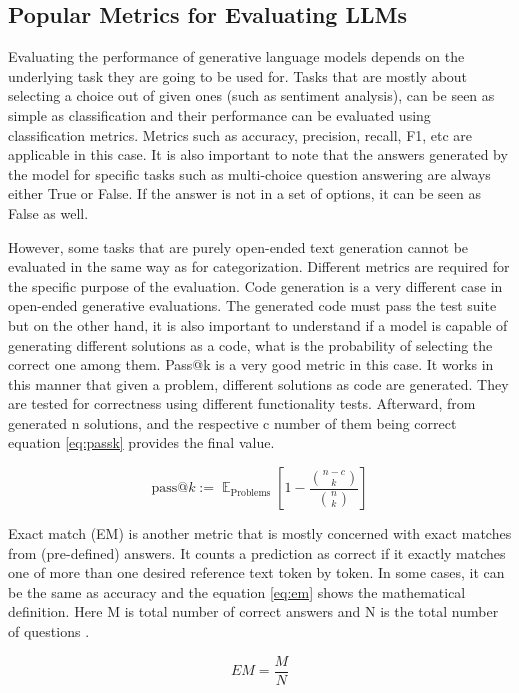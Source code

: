 \documentclass[conference]{IEEEtran}
\begin{document}
\subsection{Popular Metrics for Evaluating LLMs}
Evaluating the performance of generative language models  depends on the underlying task they are going to be used for. Tasks that are mostly about selecting a choice out of given ones (such as sentiment analysis), can be seen as simple as classification and their performance can be evaluated using classification metrics. Metrics such as accuracy, precision, recall, F1, etc are applicable in this case. It is also important to note that the answers generated by the model for specific tasks such as multi-choice question answering are always either True or False. If the answer is not in a set of options, it can be seen as False as well.

However, some tasks that are purely open-ended text generation cannot be evaluated in the same way as for categorization. Different metrics are required for the specific purpose of the evaluation. Code generation is a very different case in open-ended generative evaluations. The generated code must pass the test suite but on the other hand, it is also important to understand if a model is capable of generating different solutions as a code, what is the probability of selecting the correct one among them. Pass@k is a very good metric in this case. It works in this manner that given a problem, different solutions as code are generated. They are tested for correctness using different functionality tests. Afterward, from generated n solutions, and the respective c number of them being correct equation \ref{eq:passk} provides the final value.

\begin{equation}\label{eq:passk}
    \text{pass@$k$} := \mathop{\mathbb{E}}_{\text{Problems}} \left[ 1 - \frac{{\binom{n-c}{k}}} {\binom{n}{k}} \right]
\end{equation}

Exact match (EM) is another metric that is mostly concerned with exact matches from (pre-defined) answers. It counts a prediction as correct if it exactly matches one of more than one desired reference text token by token. In some cases, it can be the same as accuracy and the equation \ref{eq:em} shows the mathematical definition. Here M is total number of correct answers and N is the total number of questions \cite{bai2021more}.

\begin{equation}\label{eq:em}
    EM = \frac{M}{N}
\end{equation}
\end{document}
